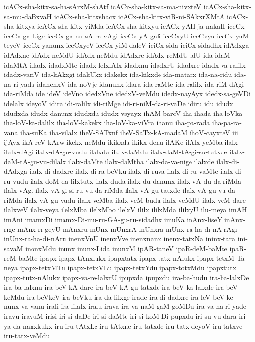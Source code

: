{icACx-sha-kitx-sa-ha-sArxM-shAtf
icACx-sha-kitx-sa-ma-nivxteV
icACx-sha-kitx-sa-mu-daBxvaH
icACx-sha-kitxshacx
icACx-sha-kitx-viR-ni-SAkxrXMtA
icACx-sha-kitxya
icACx-sha-kitx-yiMda
icACx-sha-kitxyu
icACx-yAH-ja-nakaH
iceCx
iceCx-ga-Lige
iceCx-ga-nu-sA-ra-vAgi
iceCx-yA-gali
iceCxyU
iceCxya
iceCx-yaM-teyeV
iceCx-yanunx
iceCxyeV
iceCx-yiM-daleV
iciCx-sida
iciCx-sidadhx
idAdxga
idAdxne
idAdx-neMdU
idAdx-neMdu
idAdxre
idAdx-reMdU
idU
ida
idaM
idaMtA
idadx
idadxMte
idadx-lelxlAlx
idadxnu
idadxrU
idadxre
idadx-va-ralilx
idadx-variV
ida-kAkxgi
idakUkx
idakekx
ida-kikxde
ida-matarx
ida-na-ridu
ida-na-ri-yada
idanenxV
ida-noVje
idanunx
idara
ida-raMte
ida-ralilx
ida-riM-dAgi
ida-riMda
ide
ideV
ideVno
idedxVne
idedxV-veMdu
idedx-nayAyx
idedx-sa-geVDi
idelalx
ideyoV
idira
idi-ralilx
idi-riMge
idi-ri-niM-da-ri-vaDe
idiru
idu
idudx
idudxda
idudx-danunx
idudxdu
idudx-vayayx
ihAM-bareV
iha
ihada
iha-loVka
iha-loV-ka-dalilx
iha-loV-kakekx
iha-loV-ka-viVra
ihanu
iha-pa-rada
iha-pa-ra-vana
iha-suKa
iha-vilalx
iheV-SATxnf
iheV-SaTx-kA-madaM
ihoV-cayxteV
iii
ijAyx
ikA-reV-kArw
ikekx-neMdu
ikikxda
ikikx-denu
ilAKe
ilAlx-yeMba
ilalx
ilalx-dAgi
ilalx-dA-gu-vudu
ilalxda
ilalx-daMdu
ilalx-daM-tA-gi-su-tatxde
ilalx-daM-tA-gu-vu-dilalx
ilalx-daMte
ilalx-daMtha
ilalx-da-va-nige
ilalxde
ilalx-di-dAdxga
ilalx-di-dadxre
ilalx-di-ra-beVku
ilalx-di-ruva
ilalx-di-ru-vaMte
ilalx-di-ru-vudu
ilalx-doM-da-lilxtutx
ilalx-duda
ilalx-du-danunx
ilalx-vA-du-da-riMda
ilalx-vAgi
ilalx-vA-gi-si-ru-vu-da-riMda
ilalx-vA-gu-tatxde
ilalx-vA-gu-vu-da-riMda
ilalx-vA-gu-vudu
ilalx-veMba
ilalx-veM-budu
ilalx-veMdU
ilalx-veM-dare
ilalxveV
ilalx-veya
ilelxMba
ilelxMbo
ilelxV
ililx
ililxMda
ililxyU
ilu-meya
imAH
imAni
imamxDi
imamx-Di-mu-ru-GA-gu-ru-sidadhx
imuKa
inAnx-liseY
inAnx-rige
inAnx-ri-geyU
inAnxru
inUnx
inUnxrA
inUnxra
inUnx-ra-ha-di-nA-rAgi
inUnx-ra-ha-di-nAru
inenxVnU
inenxVve
inenxnanx
inenx-tatxNa
ininx-tara
ini-savaM
inonxMdu
inunx
inunx-Lida
inunxM
ipAR-taneV
ipaR-deM-baMte
ipaR-reM-baMte
ipapx
ipapx-tAnxlukx
ipapxtatx
ipapx-tatx-nAlukx
ipapx-tetxM-Ta-neya
ipapx-tetxMTu
ipapx-tetxVLu
ipapx-tetxYdu
ipapx-totxMdu
ipapxtutx
ipapx-tutx-nAlukx
ipapx-va-re-lalxrU
ipupxda
ipupxdu
ira-ba-hudu
ira-ba-lalxDe
ira-ba-lalxnu
ira-beV-kA-dare
ira-beV-kA-gu-tatxde
ira-beV-ka-lalxde
ira-beV-keMdu
ira-beVkeV
ira-beVku
ira-da-lilxge
irade
ira-di-dadxre
ira-leV-beV-ke-nunx-va-vanu
irali
ira-lilalx
iralu
irava
ira-va-naM-gaM-goMDu
ira-va-na-ri-yade
iravu
iravuM
irisi
iri-si-daDe
iri-si-daMte
iri-si-koM-Di-pupxdu
iri-su-vu-dara
iri-ya-da-nanxkukx
iru
iru-tAtxLe
iru-tAtxne
iru-tatxde
iru-tatx-deyoV
iru-tatxve
iru-tatx-veMdu
}
